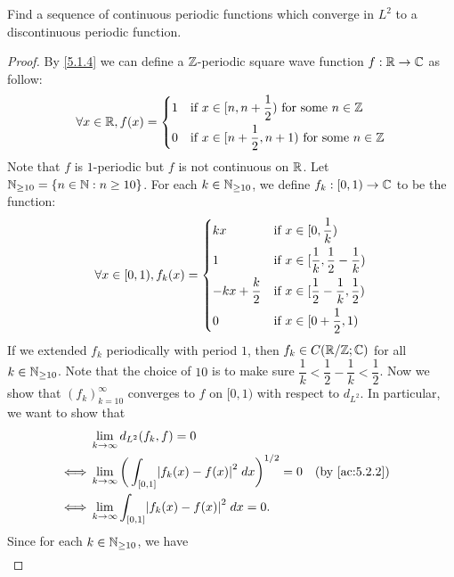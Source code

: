 \begin{ex}\label{ex:5.2.5}
  Find a sequence of continuous periodic functions which converge in \(L^2\) to a discontinuous periodic function.
\end{ex}

\begin{proof}
  By \cref{5.1.4} we can define a \(\mathbb{Z}\)-periodic square wave function \(f : \mathbb{R} \to \mathbb{C}\) as follow:
  \[
    \forall x \in \mathbb{R}, f(x) = \begin{dcases}
      1 & \text{if } x \in [n, n + \dfrac{1}{2}) \text{ for some } n \in \mathbb{Z}     \\
      0 & \text{if } x \in [n + \dfrac{1}{2}, n + 1) \text{ for some } n \in \mathbb{Z}
    \end{dcases}
  \]
  Note that \(f\) is \(1\)-periodic but \(f\) is not continuous on \(\mathbb{R}\).
  Let \(\mathbb{N}_{\geq 10} = \{n \in \mathbb{N} : n \geq 10\}\).
  For each \(k \in \mathbb{N}_{\geq 10}\), we define \(f_k : [0, 1) \to \mathbb{C}\) to be the function:
  \[
    \forall x \in [0, 1), f_k(x) = \begin{dcases}
      kx                 & \text{if } x \in [0, \dfrac{1}{k})                           \\
      1                  & \text{if } x \in [\dfrac{1}{k}, \dfrac{1}{2} - \dfrac{1}{k}) \\
      -kx + \dfrac{k}{2} & \text{if } x \in [\dfrac{1}{2} - \dfrac{1}{k}, \dfrac{1}{2}) \\
      0                  & \text{if } x \in [0 + \dfrac{1}{2}, 1)
    \end{dcases}
  \]
  If we extended \(f_k\) periodically with period \(1\), then \(f_k \in C(\mathbb{R} / \mathbb{Z} ; \mathbb{C})\) for all \(k \in \mathbb{N}_{\geq 10}\).
  Note that the choice of \(10\) is to make sure \(\dfrac{1}{k} < \dfrac{1}{2} - \dfrac{1}{k} < \dfrac{1}{2}\).
  Now we show that \((f_k)_{k = 10}^\infty\) converges to \(f\) on \([0, 1)\) with respect to \(d_{L^2}\).
  In particular, we want to show that
  \begin{align*}
         & \lim_{k \to \infty} d_{L^2}(f_k, f) = 0                                                                  \\
    \iff & \lim_{k \to \infty} \bigg(\int_{[0, 1]} \abs{f_k(x) - f(x)}^2 \; dx\bigg)^{1 / 2} = 0 &  & \by{ac:5.2.2} \\
    \iff & \lim_{k \to \infty} \int_{[0, 1]} \abs{f_k(x) - f(x)}^2 \; dx = 0.
  \end{align*}
  Since for each \(k \in \mathbb{N}_{\geq 10}\), we have
  \begin{align*}

\end{align*}
\end{proof}
